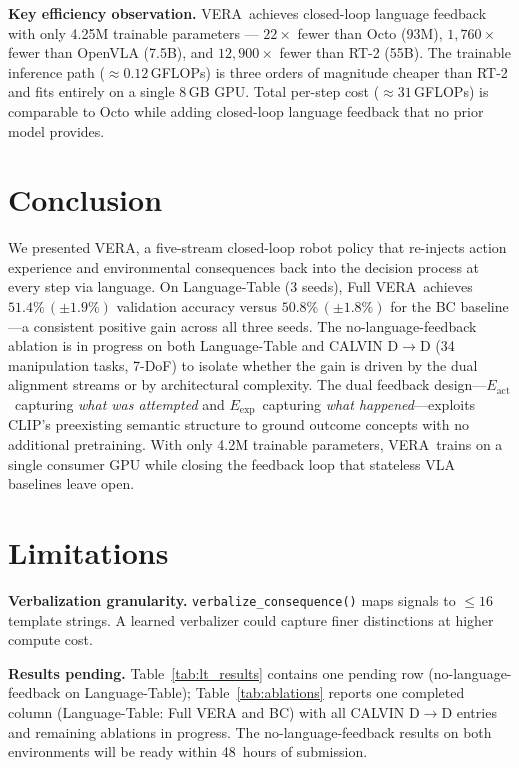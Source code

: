 \documentclass{article}
\newcommand{\modelname}{\textsc{VERA}\xspace}
\newcommand{\Lact}{$E_{\mathrm{act}}$\xspace}
\newcommand{\Lexp}{$E_{\mathrm{exp}}$\xspace}
\begin{document}
\noindent\textbf{Key efficiency observation.}
\modelname\ achieves closed-loop language feedback with only 4.25M trainable
parameters --- $22\times$ fewer than Octo (93M), $1,760\times$ fewer than
OpenVLA (7.5B), and $12,900\times$ fewer than RT-2 (55B).
The trainable inference path (${\approx}0.12$\,GFLOPs) is three orders of
magnitude cheaper than RT-2 and fits entirely on a single 8\,GB GPU.
Total per-step cost (${\approx}31$\,GFLOPs) is comparable to Octo while
adding closed-loop language feedback that no prior model provides.

\section{Conclusion}
\label{sec:conclusion}

We presented \modelname, a five-stream closed-loop robot policy that
re-injects action experience and environmental consequences back into
the decision process at every step via language.
On Language-Table (3 seeds), Full \modelname\
achieves $51.4\%\,(\pm1.9\%)$ validation accuracy versus $50.8\%\,(\pm1.8\%)$
for the BC baseline---a consistent positive gain across all three seeds.
The no-language-feedback ablation is in progress on both Language-Table
and CALVIN D$\to$D (34 manipulation tasks, 7-DoF) to isolate whether the
gain is driven by the dual alignment streams or by architectural complexity.
The dual feedback design---\Lact\ capturing \emph{what was attempted} and
\Lexp\ capturing \emph{what happened}---exploits CLIP's preexisting
semantic structure to ground outcome concepts with no additional pretraining.
With only 4.2M trainable parameters, \modelname\ trains on a single
consumer GPU while closing the feedback loop that stateless VLA
baselines leave open.

\section*{Limitations}

\textbf{Verbalization granularity.}
\texttt{verbalize\_consequence()} maps signals to $\leq16$ template strings.
A learned verbalizer could capture finer distinctions at higher compute cost.

\textbf{Results pending.}
Table~\ref{tab:lt_results} contains one pending row (no-language-feedback on Language-Table);
Table~\ref{tab:ablations} reports one completed column (Language-Table: Full VERA and BC)
with all CALVIN D$\to$D entries and remaining ablations in progress.
The no-language-feedback results on both environments will be ready within
48~hours of submission.
\end{document}
